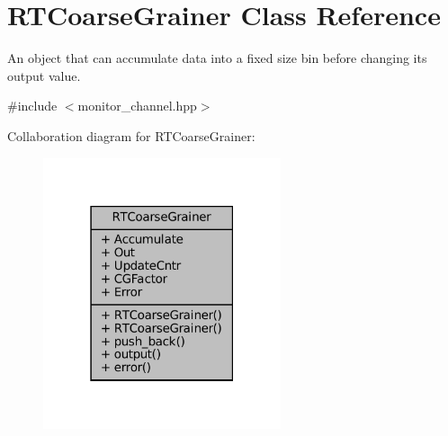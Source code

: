 \hypertarget{classRTCoarseGrainer}{}\section{R\+T\+Coarse\+Grainer Class Reference}
\label{classRTCoarseGrainer}


An object that can accumulate data into a fixed size bin before changing its output value.  




{\ttfamily \#include $<$monitor\+\_\+channel.\+hpp$>$}



Collaboration diagram for R\+T\+Coarse\+Grainer\+:\nopagebreak
\begin{figure}[H]
\begin{center}
\leavevmode
\includegraphics[width=198pt]{d6/d0f/classRTCoarseGrainer__coll__graph}
\end{center}
\end{figure}
